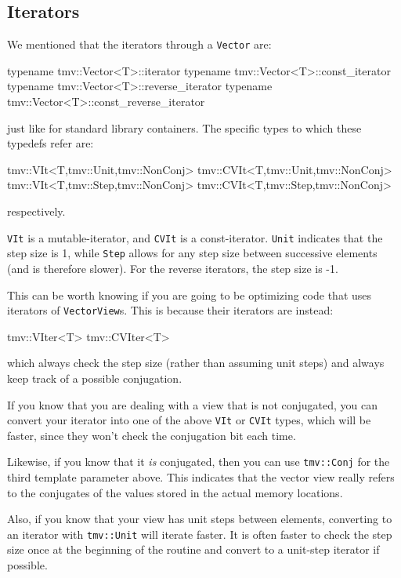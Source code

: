 \documentclass[twoside,letterpaper,11pt]{article}
\renewcommand{\tt}[1]{{\lstinline {#1}}}
\begin{document}
\subsection{Iterators}
\label{Iterators}

We mentioned that the iterators through a \tt{Vector} are:
\begin{tmvcode}
typename tmv::Vector<T>::iterator
typename tmv::Vector<T>::const_iterator
typename tmv::Vector<T>::reverse_iterator
typename tmv::Vector<T>::const_reverse_iterator
\end{tmvcode}
just like for standard library containers.  The specific types to which these
typedefs refer are:
\begin{tmvcode}
tmv::VIt<T,tmv::Unit,tmv::NonConj>
tmv::CVIt<T,tmv::Unit,tmv::NonConj>
tmv::VIt<T,tmv::Step,tmv::NonConj>
tmv::CVIt<T,tmv::Step,tmv::NonConj>
\end{tmvcode}
respectively.

\tt{VIt} is a mutable-iterator, and \tt{CVIt} is a const-iterator.  \tt{Unit} 
indicates that the step size is 1, while \tt{Step} allows for any step size
between successive elements (and is therefore slower).  For the reverse
iterators, the step size is -1.

This can be worth knowing if you are going to be optimizing code that uses
iterators of \tt{VectorView}s.
This is because their iterators are instead:
\begin{tmvcode}
tmv::VIter<T>
tmv::CVIter<T>
\end{tmvcode}
which always check the step size (rather than assuming unit steps) and always
keep track of a possible conjugation.

If you know that you are dealing with a view that is not conjugated, you can 
convert your iterator into one of the above \tt{VIt} or \tt{CVIt} types, which will be 
faster, since they won't check the conjugation bit each time. 

Likewise, if you
know that it {\em is} conjugated, then you can use \tt{tmv::Conj} for the 
third template parameter above.  This indicates that the vector view really
refers to the conjugates of the values stored in the actual memory locations.

Also, if you know that your view has unit steps between elements, converting to 
an iterator with \tt{tmv::Unit} will iterate faster.  It is often faster to check
the step size once at the beginning of the routine and convert to a unit-step
iterator if possible.
\end{document}
